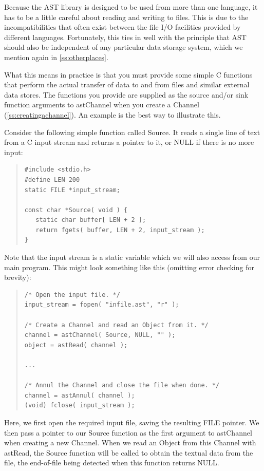 \documentclass[twoside,11pt]{article}
\newcommand{\htmlref}[2]{#1}
\newcommand{\secref}[1]{\S\ref{#1}}
\renewcommand{\secref}[1]{\ref{#1}}
\begin{document}
Because the AST library is designed to be used from more than one
language, it has to be a little careful about reading and writing to
files. This is due to the incompatibilities that often exist between
the file I/O facilities provided by different languages.  Fortunately,
this ties in well with the principle that AST should also be
independent of any particular data storage system, which we mention
again in \secref{ss:otherplaces}.

What this means in practice is that you must provide some simple C
functions that perform the actual transfer of data to and from files
and similar external data stores. The functions you provide are
supplied as the source and/or sink function arguments to \htmlref{astChannel}{astChannel}
when you create a Channel (\secref{ss:creatingachannel}). An example is
the best way to illustrate this.

Consider the following simple function called Source. It reads a
single line of text from a C input stream and returns a pointer to it,
or NULL if there is no more input:

\begin{quote}
\small
\begin{verbatim}
#include <stdio.h>
#define LEN 200
static FILE *input_stream;

const char *Source( void ) {
   static char buffer[ LEN + 2 ];
   return fgets( buffer, LEN + 2, input_stream );
}
\end{verbatim}
\normalsize
\end{quote}

Note that the input stream is a static variable which we will also
access from our main program. This might look something like this
(omitting error checking for brevity):

\begin{quote}
\small
\begin{verbatim}
/* Open the input file. */
input_stream = fopen( "infile.ast", "r" );

/* Create a Channel and read an Object from it. */
channel = astChannel( Source, NULL, "" );
object = astRead( channel );

...

/* Annul the Channel and close the file when done. */
channel = astAnnul( channel );
(void) fclose( input_stream );
\end{verbatim}
\normalsize
\end{quote}

Here, we first open the required input file, saving the resulting FILE
pointer. We then pass a pointer to our Source function as the first
argument to astChannel when creating a new Channel. When we read
an \htmlref{Object}{Object} from this Channel with \htmlref{astRead}{astRead}, the Source
function will be called to obtain the textual data from the file, the
end-of-file being detected when this function returns NULL.
\end{document}

